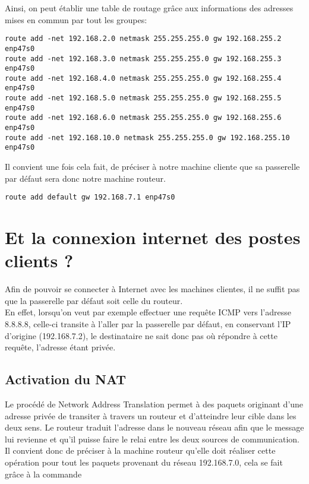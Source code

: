 Ainsi, on peut établir une table de routage grâce aux informations des adresses mises en commun par tout les groupes:

\begin{verbatim}
route add -net 192.168.2.0 netmask 255.255.255.0 gw 192.168.255.2 enp47s0
route add -net 192.168.3.0 netmask 255.255.255.0 gw 192.168.255.3 enp47s0
route add -net 192.168.4.0 netmask 255.255.255.0 gw 192.168.255.4 enp47s0
route add -net 192.168.5.0 netmask 255.255.255.0 gw 192.168.255.5 enp47s0
route add -net 192.168.6.0 netmask 255.255.255.0 gw 192.168.255.6 enp47s0
route add -net 192.168.10.0 netmask 255.255.255.0 gw 192.168.255.10 enp47s0
\end{verbatim}

Il convient une fois cela fait, de préciser à notre machine cliente que sa passerelle par défaut sera donc notre machine routeur.

\begin{verbatim}
route add default gw 192.168.7.1 enp47s0
\end{verbatim}

\section{Et la connexion internet des postes clients ?}
Afin de pouvoir se connecter à Internet avec les machines clientes, il ne suffit pas que la passerelle par défaut soit celle du routeur.\\
En effet, lorsqu'on veut par exemple effectuer une requête ICMP vers l'adresse 8.8.8.8, celle-ci transite à l'aller par la passerelle par défaut, en conservant l'IP d'origine (192.168.7.2), le destinataire ne sait donc pas où répondre à cette requête, l'adresse étant privée.

\subsection{Activation du NAT}
Le procédé de Network Address Translation permet à des paquets originant d'une adresse privée de transiter à travers un routeur et d'atteindre leur cible dans les deux sens. Le routeur traduit l'adresse dans le nouveau réseau afin que le message lui revienne et qu'il puisse faire le relai entre les deux sources de communication.\\
Il convient donc de préciser à la machine routeur qu'elle doit réaliser cette opération pour tout les paquets provenant du réseau 192.168.7.0, cela se fait grâce à la commande

